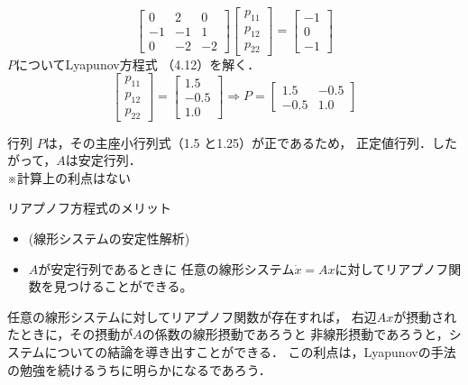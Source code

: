 \documentclass{jsarticle}
\begin{document}
\begin{equation*}
  \left[
    \begin{matrix}
      0&2&0\\-1&-1&1\\0&-2&-2
    \end{matrix}
  \right]\left[
    \begin{matrix}
      p_{11}\\p_{12}\\p_{22}
    \end{matrix}
  \right]=\left[
    \begin{matrix}
      -1\\0\\-1
    \end{matrix}
  \right]
\end{equation*}
$P$についてLyapunov方程式 （4.12）を解く．
\begin{equation*}
  \left[
    \begin{matrix}
      p_{11}\\p_{12}\\p_{22}
    \end{matrix}
  \right]=\left[
    \begin{matrix}
      1.5\\-0.5\\1.0
    \end{matrix}
  \right] \Rightarrow P =\left[
    \begin{matrix}
      1.5&-0.5\\-0.5&1.0
    \end{matrix}
  \right]
\end{equation*} 

行列 $P$は，その主座小行列式（1.5 と1.25）が正であるため，
正定値行列．したがって，$A$は安定行列．\\
※計算上の利点はない

リアプノフ方程式のメリット
\begin{itemize}
  \item (線形システムの安定性解析)
  \item $A$が安定行列であるときに
  任意の線形システム$\dot x = Ax$に対してリアプノフ関数を見つけることができる。
\end{itemize}

任意の線形システムに対してリアプノフ関数が存在すれば，
右辺$Ax$が摂動されたときに，その摂動が$A$の係数の線形摂動であろうと
非線形摂動であろうと，システムについての結論を導き出すことができる．
この利点は，Lyapunovの手法の勉強を続けるうちに明らかになるであろう．
\end{document}

